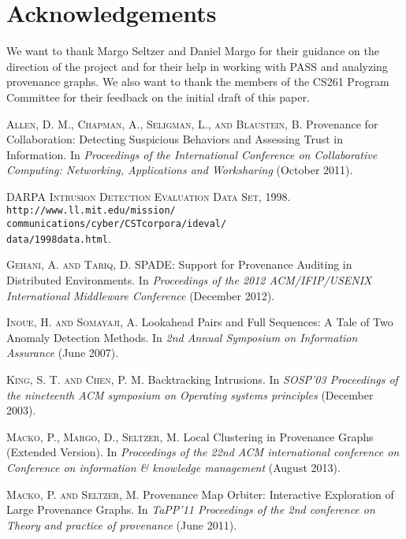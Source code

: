\documentclass[10pt,twocolumn]{article}
\begin{document}
%

\section{Acknowledgements}
We want to thank Margo Seltzer and Daniel Margo for their guidance on the direction of the project and for
their help in working with PASS and analyzing provenance graphs. We also want to thank the members of the
CS261 Program Committee for their feedback on the initial draft of this paper.


%

\begin{thebibliography}{99}

\textsc{Allen, D. M., Chapman, A., Seligman, L., and Blaustein, B.} Provenance for Collaboration: Detecting Suspicious Behaviors and Assessing Trust in Information. In {\em Proceedings of the International Conference on Collaborative Computing: Networking, Applications and Worksharing} (October 2011).

\textsc{DARPA Intrusion Detection Evaluation Data Set, 1998.} {\tt http://www.ll.mit.edu/mission/\\communications/cyber/CSTcorpora/ideval/\\data/1998data.html}.

\textsc{Gehani, A. and Tariq, D.} SPADE: Support for Provenance Auditing in Distributed Environments. In {\em Proceedings of the 2012 ACM/IFIP/USENIX International Middleware Conference} (December 2012).

\textsc{Inoue, H. and Somayaji, A.} Lookahead Pairs and Full Sequences: A Tale of Two Anomaly Detection Methods. In {\em 2nd Annual Symposium on Information Assurance} (June 2007). 

\textsc{King, S. T. and Chen, P. M.} Backtracking Intrusions. In {\em SOSP'03 Proceedings of the nineteenth ACM symposium on Operating systems principles} (December 2003).

\textsc{Macko, P., Margo, D., Seltzer, M.} Local Clustering in Provenance Graphs (Extended Version). In {\em Proceedings of the 22nd ACM international conference on Conference on information \& knowledge management} (August 2013).

\textsc{Macko, P. and Seltzer, M.} Provenance Map Orbiter: Interactive Exploration of Large Provenance Graphs. In {\em TaPP'11 Proceedings of the 2nd conference on Theory and practice of provenance} (June 2011).


\end{thebibliography}
\end{document}
